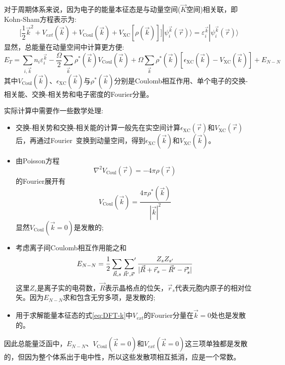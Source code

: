 \documentclass{article}      %
\begin{document}
对于周期体系来说，因为电子的能量本征态是与动量空间($\vec K$空间)相关联，即\textrm{Kohn-Sham}方程表示为:
\begin{equation}
	\bigg[\dfrac12\vec k^2+V_{ext}(\vec k)+V_{\mathrm{Coul}}(\vec k)+V_{\mathrm{XC}}[\rho(\vec k)]\bigg]|\psi_i^{\vec k}(\vec r)\rangle=\varepsilon_i^{\vec k}|\psi_i^{\vec k}(\vec r)\rangle
	\label{eq:DFT-k}
\end{equation}
显然，总能量在动量空间中计算更方便:~
\begin{equation}
	E_T=\sum_{i,\vec k}n_i\varepsilon_i^{\vec k}-\dfrac{\Omega}2\sum_{\vec k}\rho^{\ast}(\vec k)V_{\mathrm{Coul}}(\vec k)+\Omega\sum_{\vec k}\rho^{\ast}(\vec k)[\epsilon_{\mathrm{XC}}(\vec k)-V_{\mathrm{XC}}(\vec k)]+E_{N-N}
	\label{eq:DFT_ENE_G}
\end{equation}
其中$V_{\mathrm{Coul}}(\vec k)$、$\epsilon_{\mathrm{XC}}(\vec k)$与$\rho^{\ast}(\vec k)$分别是\textrm{Coulomb}相互作用、单个电子的交换-相关能、交换-相关势和电子密度的\textrm{Fourier}分量。

实际计算中需要作一些数学处理:~
\begin{itemize}
	\item 交换-相关势和交换-相关能的计算一般先在实空间计算$\epsilon_{\mathrm{XC}}(\vec r)$和$V_{\mathrm{XC}}(\vec r)$后，再通过\textrm{Fourier~}变换到动量空间，得到$\epsilon_{\mathrm{XC}}(\vec k)$和$V_{\mathrm{XC}}(\vec k)$。
	\item 由\textrm{Poisson}方程
\begin{equation}
	\nabla^2V_{\mathrm{Coul}}(\vec r)=-4\pi\rho(\vec r)
	\label{eq:Poisson}
\end{equation}
的\textrm{Fourier}展开有
\begin{equation}
	V_{\mathrm{Coul}}(\vec k)=\dfrac{4\pi\rho^{\ast}(\vec k)}{|\vec k|^2}
	\label{eq:FFT_Poisson}
\end{equation}
显然$V_{\mathrm{Coul}}(\vec k=0)$是发散的;
	\item 考虑离子间\textrm{Coulomb}相互作用能之和
	\begin{equation}
		E_{N-N}=\dfrac12\sum_{\vec R,s}\sideset{}{^{\prime}}\sum_{\vec R^{\prime},\vec s^{\prime}}\dfrac{Z_sZ_{s^{\prime}}}{|\vec R+\vec r_s-\vec R^{\prime}-\vec r_s^{\prime}|}
		\label{eq:Ion_Coulomb_ENE}
	\end{equation}
这里$Z_s$是离子实的电荷数，$\vec R$表示晶格点的位矢，$\vec r_s$代表元胞内原子的相对位矢。因为$E_{N-N}$求和包含无穷多项，是发散的;
	\item 用于求解能量本征态的式\eqref{eq:DFT-k}中$V_{ext}$的\textrm{Fourier}分量在$\vec k=0$处也是发散的。
\end{itemize}
因此总能量泛函中，$E_{N-N}$、$V_{\mathrm{Coul}}(\vec k=0)$和$V_{ext}(\vec k=0)$这三项单独都是发散的，但因为整个体系出于电中性，所以这些发散项相互抵消，应是一个常数。
\end{document}
